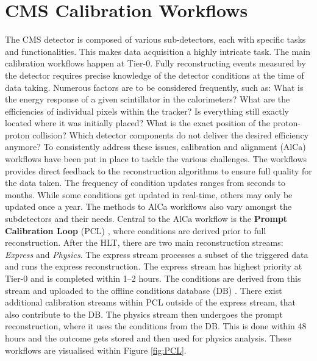 
\section{CMS Calibration Workflows}\label{sec:CMScalibration}
The CMS detector is composed of various sub-detectors, each with specific tasks and functionalities. This makes data acquisition a highly intricate task. The main calibration workflows happen at Tier-0. Fully reconstructing events measured by the detector requires precise knowledge of the detector conditions at the time of data taking. Numerous factors are to be considered frequently, such as: What is the energy response of a given scintillator in the calorimeters? What are the efficiencies of individual pixels within the tracker? Is everything still exactly located where it was initially placed? What is the exact position of the proton-proton collision? Which detector components do not deliver the desired efficiency anymore? To consistently address these issues, calibration and alignment (AlCa) workflows have been put in place to tackle the various challenges. The workflows provides direct feedback to the reconstruction algorithms to ensure full quality for the data taken. The frequency of condition updates ranges from seconds to months. While some conditions get updated in real-time, others may only be updated once a year. The methods to AlCa workflows also vary amongst the subdetectors and their needs.
Central to the AlCa workflow is the \textbf{Prompt Calibration Loop} (PCL) \cite{David_Futyan_2010,Cerminara_2015}, where conditions are derived prior to full reconstruction. After the HLT, there are two main reconstruction streams: \textit{Express} and \textit{Physics}. The express stream processes a subset of the triggered data and runs the express reconstruction. The express stream has highest priority at Tier-0 and is completed within 1--2 hours. The conditions are derived from this stream and uploaded to the offline conditions database (DB) \cite{di2015cms}. There exist additional calibration streams within PCL outside of the express stream, that also contribute to the DB.
The physics stream then undergoes the prompt reconstruction, where it uses the conditions from the DB. This is done within 48 hours and the outcome gets stored and then used for physics analysis. These workflows are visualised within Figure \ref{fig:PCL}. 

